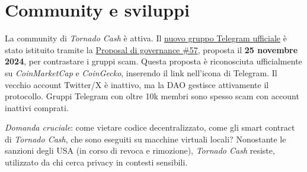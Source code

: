 \section{Community e sviluppi}
La community di \textit{Tornado Cash} è attiva. Il \href{https://t.me/TornadoCashOfficialDAO/}{nuovo gruppo Telegram ufficiale} è stato istituito tramite la \href{https://etherscan.io/address/0x01f9Db30C7EEaAa81f4037eABEaB22682E9Cc61C#code}{Proposal di governance \#57}, proposta il \textbf{25 novembre 2024}, per contrastare i gruppi scam. Questa proposta è riconosciuta ufficialmente su \textit{CoinMarketCap}\cite{coinmarketcap} e \textit{CoinGecko}\cite{coingecko}, inserendo il link nell'icona di Telegram. Il vecchio account Twitter/X è inattivo, ma la DAO gestisce attivamente il protocollo. Gruppi Telegram con oltre 10k membri sono spesso scam con account inattivi comprati.

\textit{Domanda cruciale}: come vietare codice decentralizzato, come gli smart contract di \textit{Tornado Cash}, che sono eseguiti su macchine virtuali locali? Nonostante le sanzioni degli USA (in corso di revoca e rimozione), \textit{Tornado Cash} resiste, utilizzato da chi cerca privacy in contesti sensibili.